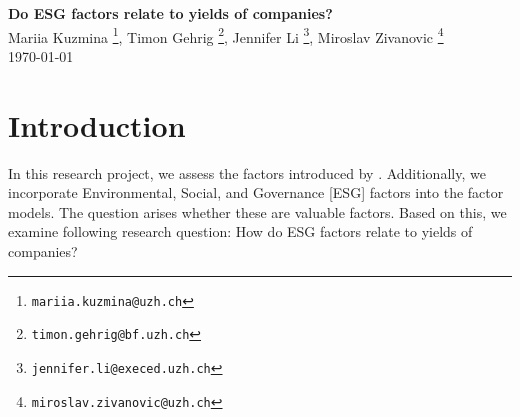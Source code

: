 \documentclass[12pt, a4paper]{article}%
\begin{document}
%
%

\begin{titlepage}

\setlength{\topmargin}{0.5cm}

\center

{\Large \bfseries Do ESG factors relate to yields of companies?
}\\[0.5cm] 

Mariia Kuzmina \footnote{\texttt{mariia.kuzmina@uzh.ch}},
Timon Gehrig \footnote{\texttt{timon.gehrig@bf.uzh.ch}},
Jennifer Li \footnote{\texttt{jennifer.li@execed.uzh.ch}},
Miroslav Zivanovic \footnote{\texttt{miroslav.zivanovic@uzh.ch}}\\
\today
\\ [2cm]

\begin{abstract}
    In this project, we employ the Fama and French 3-Factor Model to analyze the relationship between market risk, size, value on monthly returns for Nasdaq 100 constituents. Further, we examine the effects of incorporating an ESG factor into the factor model.
    The results indicate negative betas for market risk and size, suggesting that high returns cannot be solely achieved through systematic risk. Additionally, the inclusion of the ESG factor shows a positive coefficient, suggesting that companies with superior ESG standards may outperform, although statistical significance remains limited.
    Further research with an extended time period and larger sample size may enhance the robustness of these findings.
\end{abstract}

\vspace{3cm}



\vfill 
\end{titlepage}

\tableofcontents


%
%
\newpage
\section{Introduction}
In this research project, we assess the factors introduced by \textcite{FamaFrench1992}. Additionally, we incorporate Environmental, Social, and Governance [ESG] factors into the factor models.
The question arises whether these are valuable factors. Based on this, we examine following research question: How do ESG factors relate to yields of companies?
\end{document}
